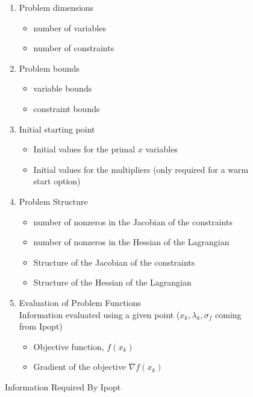 \documentclass[letter,10pt]{article}
\begin{document}
{\begin{figure}
\caption{Information Required By Ipopt}
\begin{enumerate}
        \item Problem dimensions \label{it.prob_dim}
                \begin{itemize}
                        \item number of variables
                        \item number of constraints
                \end{itemize}
        \item Problem bounds
                \begin{itemize}
                        \item variable bounds
                        \item constraint bounds
                \end{itemize}
        \item Initial starting point
                \begin{itemize}
                        \item Initial values for the primal $x$ variables
                        \item Initial values for the multipliers (only
                          required for a warm start option)
                \end{itemize}
        \item Problem Structure \label{it.prob_struct}
                \begin{itemize}
                \item number of nonzeros in the Jacobian of the constraints
                \item number of nonzeros in the Hessian of the Lagrangian
                \item Structure of the Jacobian of the constraints
                \item Structure of the Hessian of the Lagrangian
                \end{itemize}
        \item Evaluation of Problem Functions \label{it.prob_eval} \\
        Information evaluated using a given point 
        ($x_k, \lambda_k, \sigma_f$ coming from Ipopt)
                \begin{itemize}
                        \item Objective function, $f(x_k)$
                        \item Gradient of the objective $\nabla f(x_k)$

\end{itemize}
\end{enumerate}
\end{figure}}
\end{document}
